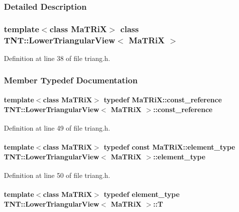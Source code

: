 \subsubsection{Detailed Description}
\subsubsection*{template$<$class MaTRiX$>$ class TNT::LowerTriangularView$<$ MaTRiX $>$}



Definition at line 38 of file triang.h.



\subsubsection{Member Typedef Documentation}
\paragraph[{const\_\-reference}]{\setlength{\rightskip}{0pt plus 5cm}template$<$class MaTRiX$>$ typedef MaTRiX::const\_\-reference {\bf TNT::LowerTriangularView}$<$ MaTRiX $>$::{\bf const\_\-reference}}\hfill\label{class_t_n_t_1_1_lower_triangular_view_a5f1897676c05bb6efef1010f32d507b9}


Definition at line 49 of file triang.h.

\paragraph[{element\_\-type}]{\setlength{\rightskip}{0pt plus 5cm}template$<$class MaTRiX$>$ typedef const MaTRiX::element\_\-type {\bf TNT::LowerTriangularView}$<$ MaTRiX $>$::{\bf element\_\-type}}\hfill\label{class_t_n_t_1_1_lower_triangular_view_a70f2e8cbfb81cbc76c14a5f9b8361328}


Definition at line 50 of file triang.h.

\paragraph[{T}]{\setlength{\rightskip}{0pt plus 5cm}template$<$class MaTRiX$>$ typedef {\bf element\_\-type} {\bf TNT::LowerTriangularView}$<$ MaTRiX $>$::{\bf T}}\hfill\label{class_t_n_t_1_1_lower_triangular_view_aabf948f8d6e27ca08a3da0583a00c9b1}


